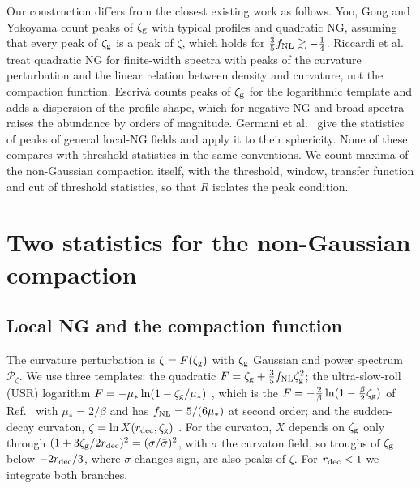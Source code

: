 \documentclass{article}
\newcommand{\zg}{\zeta_{\rm g}}
\newcommand{\fnl}{f_{\rm NL}}
\newcommand{\Pz}{\mathcal{P}_\zeta}
\begin{document}
Our construction differs from the closest existing work as follows. Yoo, Gong and Yokoyama
\cite{YGY19} count peaks of $\zg$ with typical profiles and quadratic NG, assuming that every peak
of $\zg$ is a peak of $\zeta$, which holds for $\frac35\fnl\gtrsim-\frac14$. Riccardi et
al.~\cite{Riccardi} treat quadratic NG for finite-width spectra with peaks of the curvature
perturbation and the linear relation between density and curvature, not the compaction function.
Escriv\`a \cite{Escriva26} counts peaks of $\zg$ for the logarithmic template and adds a
dispersion of the profile shape, which for negative NG and broad spectra raises the abundance by
orders of magnitude. Germani et al.~\cite{Germani25} give the statistics of peaks of general
local-NG fields and apply it to their sphericity. None of these compares with threshold statistics
in the same conventions. We count maxima of the non-Gaussian compaction itself, with the
threshold, window, transfer function and cut of threshold statistics, so that $R$ isolates the
peak condition.

\section{Two statistics for the non-Gaussian compaction}\label{sec:stats}

\subsection{Local NG and the compaction function}

The curvature perturbation is $\zeta=F(\zg)$ with $\zg$ Gaussian and power spectrum $\Pz$. We use
three templates: the quadratic $F=\zg+\frac35\fnl\zg^2$; the ultra-slow-roll (USR) logarithm
$F=-\mu_*\ln(1-\zg/\mu_*)$ \cite{AGM19}, which is the $F=-\frac2\beta\ln(1-\frac\beta2\zg)$ of
Ref.~\cite{FIVT23} with $\mu_*=2/\beta$ and has $\fnl=5/(6\mu_*)$ at second order; and the
sudden-decay curvaton, $\zeta=\ln X(r_{\rm dec},\zg)$ \cite{SVW06,Ferrante}. For the curvaton, $X$
depends on $\zg$ only through $(1+3\zg/2r_{\rm dec})^2=(\sigma/\bar\sigma)^2$, with $\sigma$ the
curvaton field, so troughs of $\zg$ below $-2r_{\rm dec}/3$, where $\sigma$ changes sign, are also
peaks of $\zeta$. For $r_{\rm dec}<1$ we integrate both branches.
\end{document}
